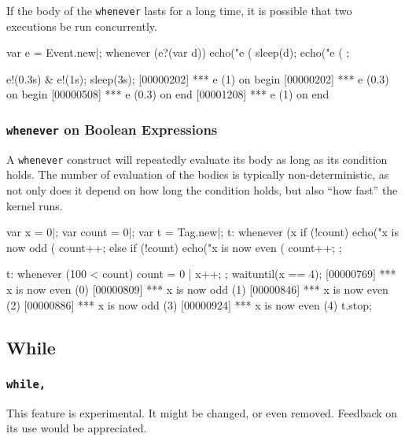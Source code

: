 If the body of the \lstinline|whenever| lasts for a long time, it is
possible that two executions be run concurrently.

\begin{urbiscript}[firstnumber=1]
var e = Event.new|;
whenever (e?(var d))
{
  echo("e (%
  sleep(d);
  echo("e (%
};

e!(0.3s) & e!(1s);
sleep(3s);
[00000202] *** e (1) on begin
[00000202] *** e (0.3) on begin
[00000508] *** e (0.3) on end
[00001208] *** e (1) on end
\end{urbiscript}

\subsubsection{\lstinline'whenever' on Boolean Expressions}

A \lstinline'whenever' construct will repeatedly evaluate its body as
long as its condition holds.  The number of evaluation of the bodies
is typically non-deterministic, as not only does it depend on how
long the condition holds, but also ``how fast'' the \urbi kernel runs.

\begin{urbiscript}[firstnumber=1]
var x = 0|;
var count = 0|;
var t = Tag.new|;
t:
  whenever (x %
  {
    if (!count)
      echo("x is now odd (%
    count++;
  }
  else
  {
    if (!count)
      echo("x is now even (%
    count++;
  };

t:
  whenever (100 < count)
  {
    count = 0 |
    x++;
  };
waituntil(x == 4);
[00000769] *** x is now even (0)
[00000809] *** x is now odd (1)
[00000846] *** x is now even (2)
[00000886] *** x is now odd (3)
[00000924] *** x is now even (4)
t.stop;
\end{urbiscript}


\subsection{While}
\subsubsection{\lstinline|while,|}
\label{sec:lang:while:comma}

\begin{note}
  This feature is experimental.  It might be changed, or even removed.
  Feedback on its use would be appreciated.
\end{note}

